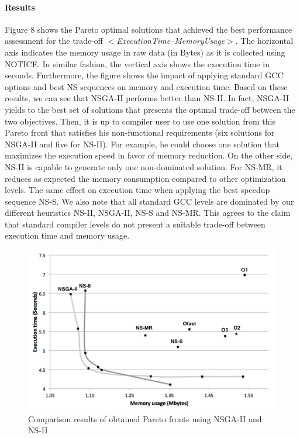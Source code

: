 \paragraph{Results}
Figure 8 shows the Pareto optimal solutions that achieved the best performance assessment for the trade-off \textit{$<$ExecutionTime--MemoryUsage$>$}. The horizontal axis indicates the memory usage in raw data (in Bytes) as it is collected using NOTICE. In similar fashion, the vertical axis shows the execution time in seconds. Furthermore, the figure shows the impact of applying standard GCC options and best NS sequences on memory and execution time. Based on these results, we can see that NSGA-II performs better than NS-II. In fact, NSGA-II yields to the best set of solutions that presents the optimal trade-off between the two objectives. Then, it is up to compiler user to use one solution from this Pareto front that satisfies his non-functional requirements (six solutions for NSGA-II and five for NS-II). For example, he could choose one solution that maximizes the execution speed in favor of memory reduction. On the other side, NS-II is capable to generate only one non-dominated solution. For NS-MR, it reduces as expected the memory consumption compared to other optimization levels. The same effect on execution time when applying the best speedup sequence NS-S. We also note that all standard GCC levels are dominated by our different heuristics NS-II, NSGA-II, NS-S and NS-MR.
This agrees to the claim that standard compiler levels do not present a suitable trade-off between execution time and memory usage.


 


\begin{figure}[h]
	\centering
	\includegraphics[width=0.9\linewidth]{Ressources/pareto.pdf}
	\caption{Comparison results of obtained Pareto fronts using NSGA-II and NS-II}
\end{figure}


